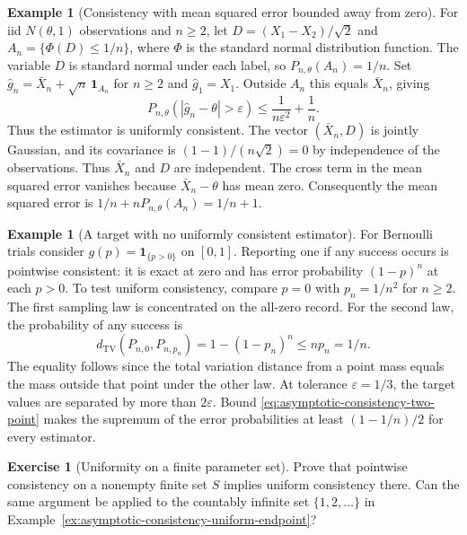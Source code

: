 \documentclass[11pt,oneside]{book}
\theoremstyle{definition}
\newtheorem{example}[theorem]{Example}
\newtheorem{exercise}{Exercise}[section]
\theoremstyle{remark}
\begin{document}
\begin{example}[Consistency with mean squared error bounded away from zero]
\label{ex:asymptotic-consistency-rare-spike}
For iid $N(\theta,1)$ observations and $n\geq2$, let
$D=(X_1-X_2)/\sqrt 2$ and $A_n=\{\Phi(D)\leq 1/n\}$, where
$\Phi$ is the standard normal distribution function.
The variable $D$ is standard normal under each label, so
$P_{n,\theta}(A_n)=1/n$. Set
$\widehat g_n=\bar X_n+\sqrt n\,\mathbf 1_{A_n}$ for $n\geq2$
and $\widehat g_1=X_1$.
Outside $A_n$ this equals $\bar X_n$, giving
\[
P_{n,\theta}(|\widehat g_n-\theta|>\varepsilon)
\leq \frac{1}{n\varepsilon^2}+\frac1n .
\]
Thus the estimator is uniformly consistent. The vector
$(\bar X_n,D)$ is jointly Gaussian, and its covariance is
$(1-1)/(n\sqrt2)=0$ by independence of the observations.
Thus $\bar X_n$ and $D$ are independent. The cross term in the
mean squared error vanishes because $\bar X_n-\theta$ has mean zero.
Consequently the mean squared error is $1/n+nP_{n,\theta}(A_n)=1/n+1$.
\end{example}

\begin{example}[A target with no uniformly consistent estimator]
\label{ex:asymptotic-consistency-bernoulli-jump}
For Bernoulli trials consider $g(p)=\mathbf 1_{\{p>0\}}$ on
$[0,1]$. Reporting one if any success occurs is pointwise
consistent: it is exact at zero and has error probability
$(1-p)^n$ at each $p>0$. To test uniform consistency, compare
$p=0$ with $p_n=1/n^2$ for $n\geq2$. The first sampling law
is concentrated on the all-zero record. For the second law,
the probability of any success is
\[
d_{\mathrm{TV}}(P_{n,0},P_{n,p_n})
=1-(1-p_n)^n\leq np_n=1/n .
\]
The equality follows since the total variation distance from a
point mass equals the mass outside that point under the other
law. At tolerance $\varepsilon=1/3$, the target values are
separated by more than $2\varepsilon$. Bound
\eqref{eq:asymptotic-consistency-two-point} makes the supremum of the
error probabilities at least $(1-1/n)/2$ for every estimator.
\end{example}

\begin{exercise}[Uniformity on a finite parameter set]
\label{exer:asymptotic-consistency-finite-uniform}
Prove that pointwise consistency on a nonempty finite set $S$
implies uniform consistency there. Can the same argument be
applied to the countably infinite set $\{1,2,\dots\}$ in
Example~\ref{ex:asymptotic-consistency-uniform-endpoint}?
\end{exercise}
\end{document}
